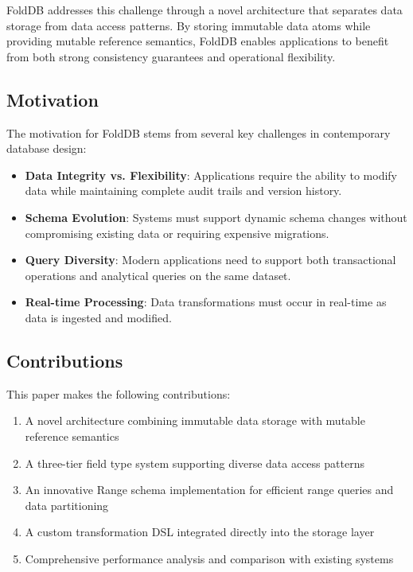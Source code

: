 \documentclass[11pt,a4paper]{article}
\begin{document}
FoldDB addresses this challenge through a novel architecture that separates data storage from data access patterns. By storing immutable data atoms while providing mutable reference semantics, FoldDB enables applications to benefit from both strong consistency guarantees and operational flexibility.

\subsection{Motivation}

The motivation for FoldDB stems from several key challenges in contemporary database design:

\begin{itemize}
\item \textbf{Data Integrity vs. Flexibility}: Applications require the ability to modify data while maintaining complete audit trails and version history.
\item \textbf{Schema Evolution}: Systems must support dynamic schema changes without compromising existing data or requiring expensive migrations.
\item \textbf{Query Diversity}: Modern applications need to support both transactional operations and analytical queries on the same dataset.
\item \textbf{Real-time Processing}: Data transformations must occur in real-time as data is ingested and modified.
\end{itemize}

\subsection{Contributions}

This paper makes the following contributions:

\begin{enumerate}
\item A novel architecture combining immutable data storage with mutable reference semantics
\item A three-tier field type system supporting diverse data access patterns
\item An innovative Range schema implementation for efficient range queries and data partitioning
\item A custom transformation DSL integrated directly into the storage layer
\item Comprehensive performance analysis and comparison with existing systems
\end{enumerate}
\end{document}
